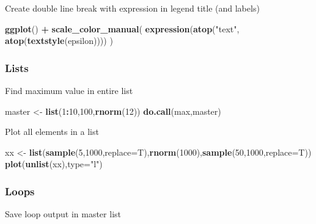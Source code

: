 \documentclass[10,portrait]{article}
\newenvironment{Shaded}{\begin{snugshade}}{\end{snugshade}}
\newcommand{\KeywordTok}[1]{\textcolor[rgb]{0.13,0.29,0.53}{\textbf{#1}}}
\newcommand{\DataTypeTok}[1]{\textcolor[rgb]{0.13,0.29,0.53}{#1}}
\newcommand{\DecValTok}[1]{\textcolor[rgb]{0.00,0.00,0.81}{#1}}
\newcommand{\StringTok}[1]{\textcolor[rgb]{0.31,0.60,0.02}{#1}}
\newcommand{\OperatorTok}[1]{\textcolor[rgb]{0.81,0.36,0.00}{\textbf{#1}}}
\newcommand{\NormalTok}[1]{#1}
\begin{document}
Create double line break with expression in legend title (and labels)

\begin{Shaded}
\begin{Highlighting}[]
\KeywordTok{ggplot}\NormalTok{() }\OperatorTok{+}
\StringTok{  }\KeywordTok{scale_color_manual}\NormalTok{(}
    \KeywordTok{expression}\NormalTok{(}\KeywordTok{atop}\NormalTok{(}\StringTok{"text"}\NormalTok{, }
    \KeywordTok{atop}\NormalTok{(}\KeywordTok{textstyle}\NormalTok{(epsilon))))}
\NormalTok{    )}
\end{Highlighting}
\end{Shaded}

\subsubsection{Lists}\label{lists}

Find maximum value in entire list

\begin{Shaded}
\begin{Highlighting}[]
\NormalTok{master <-}\StringTok{ }\KeywordTok{list}\NormalTok{(}\DecValTok{1}\OperatorTok{:}\DecValTok{10}\NormalTok{,}\DecValTok{100}\NormalTok{,}\KeywordTok{rnorm}\NormalTok{(}\DecValTok{12}\NormalTok{))}
\KeywordTok{do.call}\NormalTok{(max,master)}
\end{Highlighting}
\end{Shaded}

Plot all elements in a list

\begin{Shaded}
\begin{Highlighting}[]
\NormalTok{xx <-}\StringTok{ }\KeywordTok{list}\NormalTok{(}\KeywordTok{sample}\NormalTok{(}\DecValTok{5}\NormalTok{,}\DecValTok{1000}\NormalTok{,}\DataTypeTok{replace=}\NormalTok{T),}\KeywordTok{rnorm}\NormalTok{(}\DecValTok{1000}\NormalTok{),}\KeywordTok{sample}\NormalTok{(}\DecValTok{50}\NormalTok{,}\DecValTok{1000}\NormalTok{,}\DataTypeTok{replace=}\NormalTok{T))}
\KeywordTok{plot}\NormalTok{(}\KeywordTok{unlist}\NormalTok{(xx),}\DataTypeTok{type=}\StringTok{"l"}\NormalTok{)}
\end{Highlighting}
\end{Shaded}

\subsubsection{Loops}\label{loops}

Save loop output in master list
\end{document}
